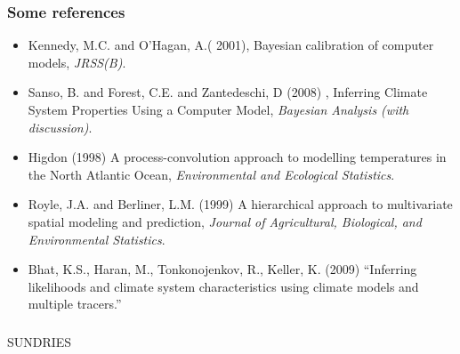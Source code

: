 \documentclass{beamer}
\begin{document}
\begin{frame}
  \frametitle{Some references }
{\small 
    \begin{itemize}
\item Kennedy, M.C. and O'Hagan, A.( 2001), Bayesian calibration of
  computer models, 
\textit{JRSS(B)}.
\item Sanso, B. and Forest, C.E. and Zantedeschi, D (2008) , Inferring Climate System Properties Using a Computer Model, \textit{Bayesian Analysis (with discussion)}.
\item  Higdon (1998) A process-convolution approach to modelling
  temperatures in the North Atlantic Ocean, \textit{Environmental and
  Ecological Statistics}.
\item Royle, J.A. and Berliner, L.M. (1999) A hierarchical approach to
  multivariate spatial modeling and prediction, {\it Journal of
    Agricultural, Biological, and Environmental Statistics}.
\item {\color{blue} Bhat, K.S., Haran, M., Tonkonojenkov, R., Keller, K. (2009)
  ``Inferring likelihoods and climate system characteristics using
  climate models and multiple tracers.''}
      \end{itemize}
}
\end{frame}

\begin{frame}
  \frametitle{}
\begin{center}
  {\Large SUNDRIES}
\end{center}

\end{frame}
\end{document}
